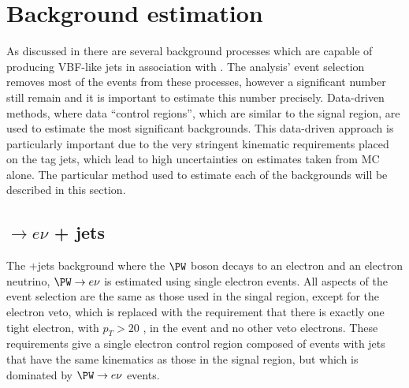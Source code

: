 \section{Background estimation}
\label{sec:promptbkg}
As discussed in  there are several background processes which are capable of producing VBF-like jets in association with \MET. The analysis' event selection removes most of the events from these processes, however a significant number still remain and it is important to estimate this number precisely. Data-driven methods, where data ``control regions'', which are similar to the signal region, are used to estimate the most significant backgrounds. This data-driven approach is particularly important due to the very stringent kinematic requirements placed on the tag jets, which lead to high uncertainties on estimates taken from \ac{MC} alone. The particular method used to estimate each of the backgrounds will be described in this section.

\subsection{\PW$\rightarrow e\nu$ + jets}
\label{sec:promptwenu}
The \PW+jets background where the $\PW$ boson decays to an electron and an electron neutrino, $\PW\rightarrow e\nu$ is estimated using single electron events. All aspects of the event selection are the same as those used in the singal region, except for the electron veto, which is replaced with the requirement that there is exactly one tight electron, with $p_{T}>20$ \GeV, in the event and no other veto electrons. These requirements give a single electron control region composed of events with jets that have the same kinematics as those in the signal region, but which is dominated by $\PW\rightarrow e\nu$ events.


